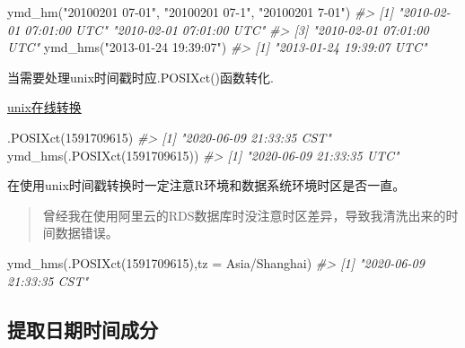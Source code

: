 \documentclass[
]{book}
\newenvironment{Shaded}{\begin{snugshade}}{\end{snugshade}}
\newcommand{\AttributeTok}[1]{\textcolor[rgb]{0.77,0.63,0.00}{#1}}
\newcommand{\CommentTok}[1]{\textcolor[rgb]{0.56,0.35,0.01}{\textit{#1}}}
\newcommand{\DecValTok}[1]{\textcolor[rgb]{0.00,0.00,0.81}{#1}}
\newcommand{\FunctionTok}[1]{\textcolor[rgb]{0.00,0.00,0.00}{#1}}
\newcommand{\NormalTok}[1]{#1}
\newcommand{\StringTok}[1]{\textcolor[rgb]{0.31,0.60,0.02}{#1}}
\begin{document}
\begin{Shaded}
\begin{Highlighting}[]
\FunctionTok{ymd\_hm}\NormalTok{(}\StringTok{"20100201 07{-}01"}\NormalTok{, }\StringTok{"20100201 07{-}1"}\NormalTok{, }\StringTok{"20100201 7{-}01"}\NormalTok{)}
\CommentTok{\#\textgreater{} [1] "2010{-}02{-}01 07:01:00 UTC" "2010{-}02{-}01 07:01:00 UTC"}
\CommentTok{\#\textgreater{} [3] "2010{-}02{-}01 07:01:00 UTC"}
\FunctionTok{ymd\_hms}\NormalTok{(}\StringTok{"2013{-}01{-}24 19:39:07"}\NormalTok{)}
\CommentTok{\#\textgreater{} [1] "2013{-}01{-}24 19:39:07 UTC"}
\end{Highlighting}
\end{Shaded}

当需要处理unix时间戳时应.POSIXct()函数转化.

\href{https://unixtime.51240.com/}{unix在线转换}

\begin{Shaded}
\begin{Highlighting}[]
\FunctionTok{.POSIXct}\NormalTok{(}\DecValTok{1591709615}\NormalTok{)}
\CommentTok{\#\textgreater{} [1] "2020{-}06{-}09 21:33:35 CST"}
\FunctionTok{ymd\_hms}\NormalTok{(}\FunctionTok{.POSIXct}\NormalTok{(}\DecValTok{1591709615}\NormalTok{))}
\CommentTok{\#\textgreater{} [1] "2020{-}06{-}09 21:33:35 UTC"}
\end{Highlighting}
\end{Shaded}

在使用unix时间戳转换时一定注意R环境和数据系统环境时区是否一直。

\begin{quote}
曾经我在使用阿里云的RDS数据库时没注意时区差异，导致我清洗出来的时间数据错误。
\end{quote}

\begin{Shaded}
\begin{Highlighting}[]
\FunctionTok{ymd\_hms}\NormalTok{(}\FunctionTok{.POSIXct}\NormalTok{(}\DecValTok{1591709615}\NormalTok{),}\AttributeTok{tz =} \StringTok{\textquotesingle{}Asia/Shanghai\textquotesingle{}}\NormalTok{)}
\CommentTok{\#\textgreater{} [1] "2020{-}06{-}09 21:33:35 CST"}
\end{Highlighting}
\end{Shaded}

\hypertarget{extracting-datetime-information}{%
\subsection{提取日期时间成分}\label{extracting-datetime-information}}
\end{document}
